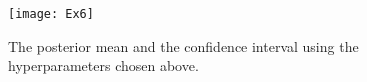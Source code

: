 \documentclass[11pt]{article}
\begin{document}
\begin{enumerate}[(A)]
\begin{figure}[h]
    \centering
    \texttt{[image: Ex6]}
    \caption{The posterior mean and the confidence interval using the hyperparameters chosen above.}
    \label{fig:CI_GP_2}
\end{figure}

%
%

\end{enumerate}
\end{document}
